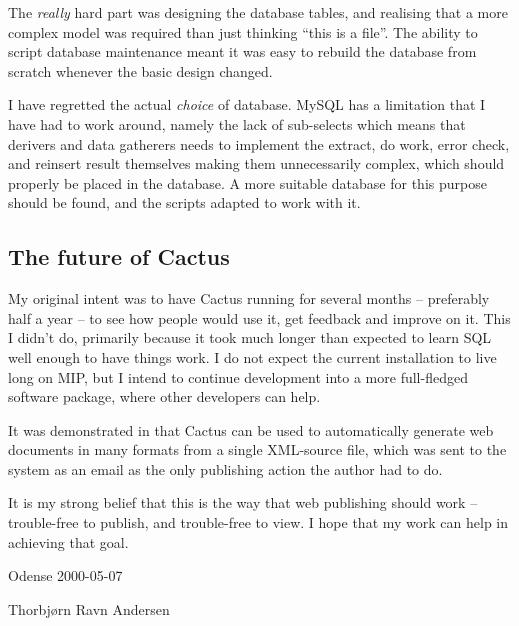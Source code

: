 The \textit{really} hard part was designing the database tables, and
realising that a more complex model was required than just thinking
``this is a file''.  The ability to script database maintenance
meant it was easy to rebuild the database from scratch whenever the
basic design changed.  

I have regretted the actual \textit{choice} of database.  MySQL has a
limitation that I have had to work around, namely the lack of
sub-selects which means that derivers and data gatherers needs to
implement the extract, do work, error check, and reinsert result
themselves making them unnecessarily complex, which should properly be
placed in the database.   A more suitable database for this purpose
should be found, and the scripts adapted to work with it.


\subsection*{The future of Cactus}

My original intent was to have Cactus running for several months --
preferably half a year -- to see how people would use it, get feedback
and improve on it.  This I didn't do, primarily because it took much
longer than expected to learn SQL well enough to have things work.  I
do not expect the current installation to live long on MIP, but I
intend to continue development into a more full-fledged software
package, where other developers can help.

It was demonstrated in  that Cactus can be
used to automatically generate web documents in many formats from a
single XML-source file, which was sent to the system as an email as
the only publishing action the author had to do.

It is my strong belief that this is the way that web publishing should
work -- trouble-free to publish, and trouble-free to view.  I hope
that my work can help in achieving that goal.




\begin{center}

\vspace{2cm}
Odense 2000-05-07

\vspace{2cm}
Thorbj{\o}rn Ravn Andersen

\end{center}


